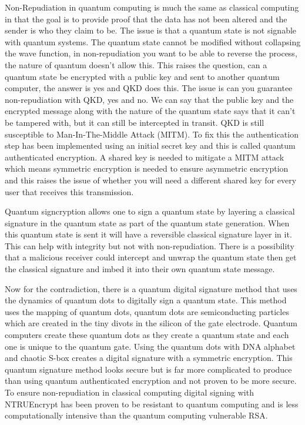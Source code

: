 \documentclass[sigconf]{acmart}
\begin{document}
Non-Repudiation in quantum computing is much the same as classical computing in that the goal is to provide proof that the data has not been altered and the sender is who they claim to be. %
The issue is that a quantum state is not signable with quantum systems. %
The quantum state cannot be modified without collapsing the wave function, in non-repudiation you want to be able to reverse the process, the nature of quantum doesn’t allow this.  This raises the question, can a quantum state be encrypted with a public key and sent to another quantum computer, the answer is yes and QKD does this. 
The issue is can you guarantee non-repudiation with QKD, yes and no. We can say that the public key and the encrypted message along with the nature of the quantum state says that it can’t be tampered with, but it can still be intercepted in transit. QKD is still susceptible to Man-In-The-Middle Attack (MITM). To fix this the authentication step has been implemented using an initial secret key and this is called quantum authenticated encryption. A shared key is needed to mitigate a MITM attack which means symmetric encryption is needed to ensure asymmetric encryption and this raises the issue of whether you will need a different shared key for every user that receives this transmission.

Quantum signcryption allows one to sign a quantum state by layering a classical signature in the quantum state as part of the quantum state generation. When this quantum state is sent it will have a reversible classical signature layer in it. This can help with integrity but not with non-repudiation. There is a possibility that a malicious receiver could intercept and unwrap the quantum state then get the classical signature and imbed it into their own quantum state message. 

Now for the contradiction, there is a quantum digital signature method that uses the dynamics of quantum dots to digitally sign a quantum state. This method uses the mapping of quantum dots, quantum dots are semiconducting particles which are created in the tiny divots in the silicon of the gate electrode. Quantum computers create these quantum dots as they create a quantum state and each one is unique to the quantum gate. Using the quantum dots with DNA alphabet and chaotic S-box creates a digital signature with a symmetric encryption. This quantum signature method looks secure but is far more complicated to produce than using quantum authenticated encryption and not proven to be more secure. To ensure non-repudiation in classical computing digital signing with NTRUEncrypt has been proven to be resistant to quantum computing and is less computationally intensive than the quantum computing vulnerable RSA\cite{cheng_h._lightweight_2021}.
\end{document}
